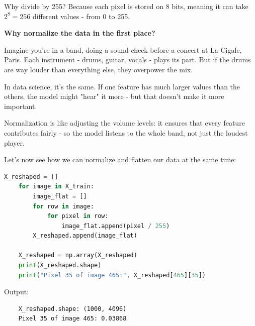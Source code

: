 \documentclass[11pt]{article}
\begin{document}
Why divide by 255? Because each pixel is stored on 8 bits, meaning it can take $2^8 = 256$ different values - from 0 to 255. 

\vspace{1em}

\begin{tcolorbox}[colback=white!98!gray, colframe=gray!30!black, arc=1mm]
\textbf{Why normalize the data in the first place?}

\vspace{0.5em}

Imagine you're in a band, doing a sound check before a concert at La Cigale, Paris.
Each instrument - drums, guitar, vocals - plays its part.  
But if the drums are way louder than everything else, they overpower the mix.

In data science, it's the same.  
If one feature has much larger values than the others, the model might "hear" it more -  
but that doesn't make it more important.

Normalization is like adjusting the volume levels:  
it ensures that every feature contributes fairly -  
so the model listens to the whole band, not just the loudest player.
\end{tcolorbox}

\vspace{1em}

\begin{center}
\end{center}

\vspace{1.5em}

Let's now see how we can normalize and flatten our data at the same time:

\begin{lstlisting}[language=Python]
    X_reshaped = []
    for image in X_train:
        image_flat = []
        for row in image:
            for pixel in row:
                image_flat.append(pixel / 255)
        X_reshaped.append(image_flat)
    
    X_reshaped = np.array(X_reshaped)
    print(X_reshaped.shape)
    print("Pixel 35 of image 465:", X_reshaped[465][35])
    \end{lstlisting}
    
    \vspace{0.5em}
    
    \noindent Output:
\begin{verbatim}
    X_reshaped.shape: (1000, 4096)
    Pixel 35 of image 465: 0.03868
\end{verbatim}
    
\end{document}
